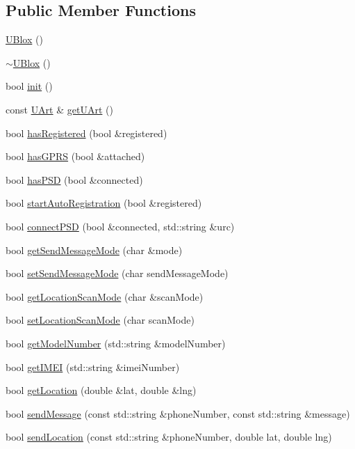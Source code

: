 \subsection*{Public Member Functions}
\begin{DoxyCompactItemize}
\item 
\hyperlink{class_u_blox_a543adc561cdd98e96a4cdc69fa42bfb6}{U\+Blox} ()
\item 
\hyperlink{class_u_blox_af4fbdf61c67e715858fd12afb43f96ca}{$\sim$\+U\+Blox} ()
\item 
bool \hyperlink{class_u_blox_a34c2f507ff3bbd21b9aea788a015527a}{init} ()
\item 
const \hyperlink{class_u_art}{U\+Art} \& \hyperlink{class_u_blox_a8c5180db80a49a194bab2baa7fb74bb2}{get\+U\+Art} ()
\item 
bool \hyperlink{class_u_blox_a1889c2b9bb6087bc939bd2a27b68623b}{has\+Registered} (bool \&registered)
\item 
bool \hyperlink{class_u_blox_a4f5a31b4ddda664b255ce3f63e9ffac7}{has\+G\+P\+RS} (bool \&attached)
\item 
bool \hyperlink{class_u_blox_ae49b51a602a327b5eff5b04d2ccaec20}{has\+P\+SD} (bool \&connected)
\item 
bool \hyperlink{class_u_blox_a2e816e864ebf43743b3f6187e20c2b1f}{start\+Auto\+Registration} (bool \&registered)
\item 
bool \hyperlink{class_u_blox_ac250bd4aea14e09b3a2595c2b8eda18a}{connect\+P\+SD} (bool \&connected, std\+::string \&urc)
\item 
bool \hyperlink{class_u_blox_aee30d82dcf52335d19f77e766db78ab4}{get\+Send\+Message\+Mode} (char \&mode)
\item 
bool \hyperlink{class_u_blox_a12c1042d3bcb503b025927fd53d54243}{set\+Send\+Message\+Mode} (char send\+Message\+Mode)
\item 
bool \hyperlink{class_u_blox_a398db4cdc2d5356fb86b3cd1021bad1b}{get\+Location\+Scan\+Mode} (char \&scan\+Mode)
\item 
bool \hyperlink{class_u_blox_aabed44fd41e16c9d1a8daba80f3bef06}{set\+Location\+Scan\+Mode} (char scan\+Mode)
\item 
bool \hyperlink{class_u_blox_ab9b9a03e10360c931686c1fe04af078d}{get\+Model\+Number} (std\+::string \&model\+Number)
\item 
bool \hyperlink{class_u_blox_ade30654ab2eab43d322dc6b516866401}{get\+I\+M\+EI} (std\+::string \&imei\+Number)
\item 
bool \hyperlink{class_u_blox_a2443d175bbf55a4f4facc5d8a99d2723}{get\+Location} (double \&lat, double \&lng)
\item 
bool \hyperlink{class_u_blox_a946f2903bb01a62cd5bdef423eaa9750}{send\+Message} (const std\+::string \&phone\+Number, const std\+::string \&message)
\item 
bool \hyperlink{class_u_blox_a23c4bd15586b776045beaaa840c637f4}{send\+Location} (const std\+::string \&phone\+Number, double lat, double lng)
\end{DoxyCompactItemize}
